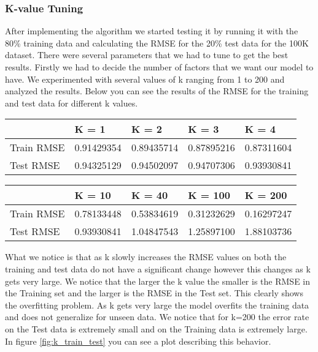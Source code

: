 \documentclass[a4paper]{article}
\begin{document}
\subsubsection*{K-value Tuning}
After implementing the algorithm we started testing it by running it with the 80\% training data and calculating the RMSE for the 20\% test data for the 100K dataset.
There were several parameters that we had to tune to get the best results. Firstly we had to decide the number of factors that we want our model to have. We experimented with several values of k ranging from 1 to 200 and analyzed the results. Below you can see the results of the RMSE for the training and test data for different k values. 
\begin{center}
    \begin{tabular}{| l | l | l | l |l|}
    \hline
     & K = 1 & K = 2 & K = 3 & K = 4 \\ \hline
    Train RMSE & 0.91429354 & 0.89435714 & 0.87895216 & 0.87311604 \\ \hline
    Test RMSE & 0.94325129 & 0.94502097 & 0.94707306 & 0.93930841 \\ \hline
    \end{tabular}
\end{center}

\begin{center}
    \begin{tabular}{| l | l | l | l |l|}
    \hline
     & K = 10 & K = 40 & K = 100 & K = 200 \\ \hline
    Train RMSE & 0.78133448 & 0.53834619 & 0.31232629 & 0.16297247 \\ \hline
    Test RMSE & 0.93930841 & 1.04847543 & 1.25897100 & 1.88103736 \\ \hline
    \hline
    \end{tabular}
\end{center}
What we notice is that as k slowly increases the RMSE values on both the training and test data do not have a significant change however this changes as k gets very large. We notice that the larger the k value the smaller is the RMSE in the Training set and the larger is the RMSE in the Test set. This clearly shows the overfitting problem. As k gets very large  the model overfits the training data and does not generalize for unseen data. We notice that for k=200 the error rate on the Test data is extremely small and on the Training data is extremely large. In figure \ref{fig:k_train_test} you can see a plot describing this behavior.
\end{document}
